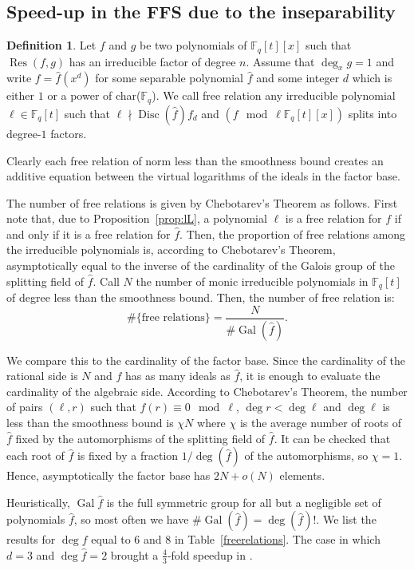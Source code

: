 \documentclass[a4wide]{article}
\newcommand{\F}{{\mathbb F}}
\DeclareMathOperator{\Gal}{Gal}
\DeclareMathOperator{\Disc}{Disc}
\DeclareMathOperator{\Res}{Res}
\theoremstyle{plain}
\theoremstyle{definition}
\newtheorem{deff}[theo]{Definition}
\theoremstyle{remark}
\begin{document}
\subsection{Speed-up in the FFS due to the inseparability}
\label{ssec:speedup}
\begin{deff}
	Let $f$ and $g$ be two polynomials of $\F_q[t][x]$ such that
	$\Res(f,g)$ has an irreducible factor of degree $n$. Assume that
	$\deg_xg=1$ and write $f=\hat{f}(x^d)$ for some separable polynomial
	$\hat{f}$ and some integer $d$ which is either $1$ or a power of
	char($\F_q$). We call free relation any irreducible polynomial $\ell\in\F_q[t]$ such that $\ell\nmid
	\Disc(\hat{f})f_d$ and $(f\mod \ell\F_q[t][x])$ splits into degree-$1$ factors. 
\end{deff}
Clearly each free relation of norm less than the smoothness bound creates an
additive equation between the virtual logarithms of the ideals in the factor
base.

The number of free relations is given by Chebotarev's Theorem as follows.
First note that, due to Proposition~\ref{prop:lL}, a polynomial $\ell$ is a free relation for $f$ if and only
if it is a free relation for $\hat{f}$. Then, the proportion of free
relations among the irreducible polynomials is, according to Chebotarev's Theorem, asymptotically equal to the
inverse of the cardinality of the Galois group of the splitting field of
$\hat{f}$. Call $N$ the number of monic
irreducible polynomials in $\F_q[t]$ of
degree less than the smoothness bound.
Then, the number of free relation is:
\begin{equation}
	\# \{\text{free relations}\}=\frac{N}{\#\Gal(\hat{f})}.
\end{equation}

We compare this to the cardinality of the factor base. Since the cardinality
of the rational side is $N$ and $f$ has as many ideals as
$\hat{f}$, it is enough to evaluate the cardinality of the algebraic side. According to
Chebotarev's Theorem, the number of pairs $(\ell,r)$ such that
$f(r)\equiv0\mod \ell$, $\deg r <\deg \ell$ and $\deg \ell$ is less than the
smoothness bound is $\chi N$ where $\chi$ is the average number of
roots of $\hat{f}$ fixed by the automorphisms of the splitting field of
$\hat{f}$. It can be checked that each root of $\hat{f}$ is fixed by a
fraction 
$1/\deg(\hat{f})$ of the automorphisms, so $\chi=1$. Hence, asymptotically the
factor base has $2N+o(N)$ elements. 

Heuristically, $\Gal \hat{f}$ is the full symmetric group for all but a
negligible set of polynomials $\hat{f}$, so most often we have
$\#\Gal(\hat{f})=\deg(\hat{f})!$. We list the
results for $\deg f$ equal to $6$ and $8$ in Table~\ref{freerelations}. The case in which $d=3$ and $\deg \hat{f}=2$ brought a $\frac{4}{3}$-fold
speedup in \cite{Japanese2010}.
\end{document}
